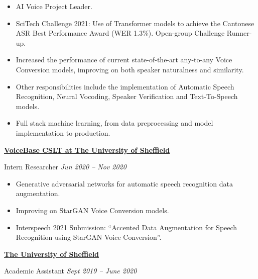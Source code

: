 \documentclass[10pt]{article} %
\begin{document}
\begin{changemargin}{0pt}{0.5pt}
\begin{minipage}[t]{0.5\textwidth}
\begin{changemargin}{1pt}{1pt}
\begin{itemize} \itemsep-2pt %
	\item AI Voice Project Leader. 
	\item SciTech Challenge 2021: Use of Transformer models to achieve the Cantonese ASR Best Performance Award (WER 1.3\%). Open-group Challenge Runner-up.
	\item Increased the performance of current state-of-the-art any-to-any Voice Conversion models, improving on both speaker naturalness and similarity.
	\item Other  responsibilities include the implementation of Automatic Speech Recognition, Neural Vocoding, Speaker Verification and Text-To-Speech models.
	\item Full stack machine learning, from data preprocessing and model implementation to production.
\end{itemize}
	

\vspace{5pt}
\underline{\textbf{VoiceBase CSLT at The University of Sheffield}}\\
\par
\vspace{-10pt}
Intern Researcher \hfill \textit{Jun 2020 -- Nov 2020}\\
\vspace{-15pt}

\begin{itemize} \itemsep-2pt %
  \item Generative adversarial networks for automatic speech recognition data augmentation.
  \item Improving on StarGAN Voice Conversion models.
  \item Interspeech 2021 Submission: \enquote{Accented Data Augmentation for Speech Recognition using StarGAN Voice Conversion}.
\end{itemize}


\vspace{5pt}
\underline{\textbf{The University of Sheffield}}\\
\par
\vspace{-10pt}
Academic Assistant \hfill \textit{Sept 2019 -- June 2020}\\
\vspace{-15pt}


\end{changemargin}
\end{minipage}
\end{changemargin}
\end{document}
